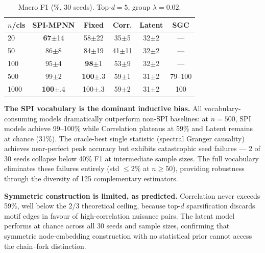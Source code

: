 \documentclass{article}
\theoremstyle{plain}
\begin{document}

\begin{table}[ht]
\caption{Macro F1 (\%, 30 seeds). Top-$d{=}5$, group $\lambda{=}0.02$.}
\label{tab:main}
\vskip 0.1in
\begin{center}
\begin{small}
\begin{tabular}{lccccc}
\toprule
$n$/cls & SPI-MPNN & Fixed & Corr. & Latent & SGC \\
\midrule
20   & \textbf{67}{\scriptsize$\pm$14} & 58{\scriptsize$\pm$22} & 35{\scriptsize$\pm$5}  & 32{\scriptsize$\pm$2} & --- \\
50   & 86{\scriptsize$\pm$8}  & 84{\scriptsize$\pm$19} & 41{\scriptsize$\pm$11} & 32{\scriptsize$\pm$2} & --- \\
100  & 95{\scriptsize$\pm$4}  & \textbf{98}{\scriptsize$\pm$1}  & 53{\scriptsize$\pm$9}  & 32{\scriptsize$\pm$2} & --- \\
500  & 99{\scriptsize$\pm$2}  & \textbf{100}{\scriptsize$\pm$.3} & 59{\scriptsize$\pm$1}  & 31{\scriptsize$\pm$2} & 79--100 \\
1000 & \textbf{100}{\scriptsize$\pm$.4} & 100{\scriptsize$\pm$.3} & 59{\scriptsize$\pm$2}  & 31{\scriptsize$\pm$2} & 100 \\
\bottomrule
\end{tabular}
\end{small}
\end{center}
\vskip -0.15in
\end{table}

\textbf{The SPI vocabulary is the dominant inductive bias.} All vocabulary-consuming models dramatically outperform non-SPI baselines: at $n{=}500$, SPI models achieve 99--100\% while Correlation plateaus at 59\% and Latent remains at chance (31\%). The oracle-best single statistic (spectral Granger causality) achieves near-perfect peak accuracy but exhibits catastrophic seed failures --- 2 of 30 seeds collapse below 40\% F1 at intermediate sample sizes. The full vocabulary eliminates these failures entirely (std $\leq 2$\% at $n \geq 50$), providing robustness through the diversity of 125 complementary estimators.

\textbf{Symmetric construction is limited, as predicted.} Correlation never exceeds 59\%, well below the $2/3$ theoretical ceiling, because top-$d$ sparsification discards motif edges in favour of high-correlation nuisance pairs. The latent model performs at chance across all 30 seeds and sample sizes, confirming that symmetric node-embedding construction with no statistical prior cannot access the chain--fork distinction.
\end{document}
